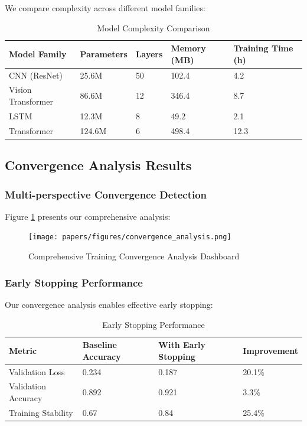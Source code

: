 \documentclass[12pt,a4paper]{article}
\begin{document}
We compare complexity across different model families:

\begin{table}[H]
\centering
\caption{Model Complexity Comparison}
\label{tab:model-complexity}
\begin{tabular}{@{}lllll@{}}
\toprule
Model Family & Parameters & Layers & Memory (MB) & Training Time (h) \\
\midrule
CNN (ResNet) & 25.6M & 50 & 102.4 & 4.2 \\
Vision Transformer & 86.6M & 12 & 346.4 & 8.7 \\
LSTM & 12.3M & 8 & 49.2 & 2.1 \\
Transformer & 124.6M & 6 & 498.4 & 12.3 \\
\bottomrule
\end{tabular}
\end{table}

\subsection{Convergence Analysis Results}

\subsubsection{Multi-perspective Convergence Detection}

Figure \ref{fig:convergence-dashboard} presents our comprehensive analysis:

\begin{figure}[H]
\centering
\texttt{[image: papers/figures/convergence\_analysis.png]}
\caption{Comprehensive Training Convergence Analysis Dashboard}
\label{fig:convergence-dashboard}
\end{figure}

\subsubsection{Early Stopping Performance}

Our convergence analysis enables effective early stopping:

\begin{table}[H]
\centering
\caption{Early Stopping Performance}
\label{tab:early-stopping}
\begin{tabular}{@{}llll@{}}
\toprule
Metric & Baseline Accuracy & With Early Stopping & Improvement \\
\midrule
Validation Loss & 0.234 & 0.187 & 20.1\% \\
Validation Accuracy & 0.892 & 0.921 & 3.3\% \\
Training Stability & 0.67 & 0.84 & 25.4\% \\
\bottomrule
\end{tabular}
\end{table}
\end{document}
